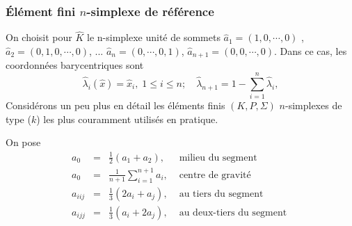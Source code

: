 \documentclass{beamer}
\begin{document}
\begin{frame}
\frametitle{Élément fini $n$-simplexe de référence}

On choisit pour $\widehat{K}$ le n-simplexe unité de sommets 
$\hat{a}_1= (1 , 0, \cdots, 0)$ , $\hat{a}_2= (0,1 , 0, \cdots, 0)$, ... $\hat{a}_n= (0 , \cdots, 0,1)$, $\hat{a}_{n+1}= (0 , 0, \cdots, 0)$. Dans ce cas, les coordonnées barycentriques sont
\begin{equation}
\hat{\lambda}_i(\hat{x})=\hat{x}_i,\; 1\leq i\leq n;\quad \hat{\lambda}_{n+1}=1-\sum_{i=1}^n\hat{\lambda}_i,
\end{equation}
       Considérons un peu plus en détail les éléments finis $(K, P, \Sigma)$ $n$-simplexes de 
type ($k$) les plus couramment utilisés en pratique.

On pose
\[\begin{array}{lcll}
a_{0}&=&\frac{1}{2}(a_1+a_2),&\mbox{ milieu du segment }\\
a_{0}&=&\displaystyle \frac{1}{n+1}\sum_{i=1}^{n+1}a_i,&\mbox{ centre de gravité }\\
a_{iij}&=&\frac{1}{3}(2a_i+a_j), & \mbox{ au tiers du segment }\\
a_{ijj}&=&\frac{1}{3}(a_i+2a_j), &  \mbox{ au deux-tiers du segment }
\end{array}
\]

\end{frame}
\end{document}
